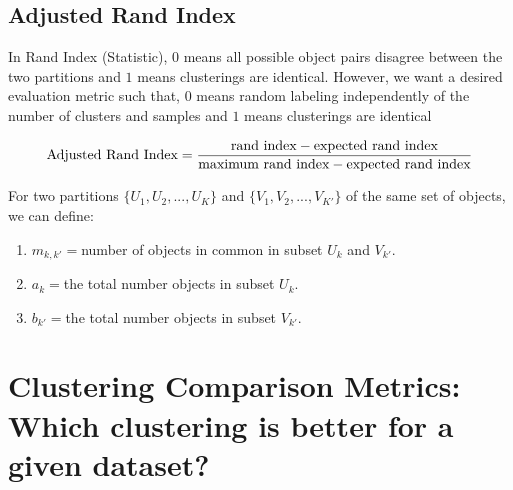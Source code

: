 \documentclass[11pt]{elegantbook}
\begin{document}
\subsection{Adjusted Rand Index}
In Rand Index (Statistic), $0$ means all possible object pairs disagree between the two partitions and $1$ means clusterings are identical. However, we want a desired evaluation metric such that, $0$ means random labeling independently of the number of clusters and samples and $1$ means clusterings are identical

\begin{definition}
    \begin{equation}
        \begin{aligned}
            \textnormal{Adjusted Rand Index}=\frac{\textnormal{rand index}-\textnormal{expected rand index}}{\textnormal{maximum rand index}-\textnormal{expected rand index}}
        \end{aligned}
        \nonumber
    \end{equation}
\end{definition}
For two partitions $\{U_1,U_2,...,U_K\}$ and $\{V_1,V_2,...,V_{K'}\}$ of the same set of objects, we can define:
\begin{enumerate}
    \item $m_{k,k'}=$number of objects in common in subset $U_k$ and $V_{k'}$.
    \item $a_k=$the total number objects in subset $U_k$.
    \item $b_{k'}=$the total number objects in subset $V_{k'}$.
\end{enumerate}









\section{Clustering Comparison Metrics: Which clustering is better for a given dataset?}
\end{document}
